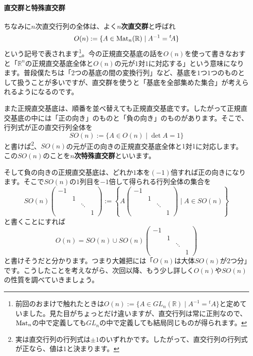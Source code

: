 \paragraph{直交群と特殊直交群}

ちなみに$n$次直交行列の全体は、よく\textbf{$n$次直交群}と呼ばれ
\[
O(n) := \{A \in \operatorname{Mat}_n(\mathbb{R}) \mid A^{-1} = {}^t\!A \}
\]
という記号で表されます\footnote{前回のおまけで触れたときは$O(n) := \{A \in GL_n(\mathbb{R}) \mid A^{-1} = {}^t\!A \}$と定めていました。見た目がちょっとだけ違いますが、直交行列は常に正則なので、$\operatorname{Mat}_n$の中で定義しても$GL_n$の中で定義しても結局同じものが得られます。}。今の正規直交基底の話を$O(n)$を使って書きなおすと「$\mathbb{R}^n$の正規直交基底全体と$O(n)$の元が$1$対$1$に対応する」という意味になります。普段僕たちは「$2$つの基底の間の変換行列」など、基底を$1$つ$1$つのものとして扱うことが多いですが、直交群を使うと「基底を全部集めた集合」が考えられるようになるのです。

また正規直交基底は、順番を並べ替えても正規直交基底です。したがって正規直交基底の中には「正の向き」のものと「負の向き」のものがあります。そこで、行列式が正の直交行列全体を
\[
SO(n) := \{A \in O(n) \mid \det A = 1\}
\]
と書けば\footnote{実は直交行列の行列式は$\pm1$のいずれかです。したがって、直交行列の行列式が正なら、値は$1$と決まります。}、$SO(n)$の元が正の向きの正規直交基底全体と$1$対$1$に対応します。この$SO(n)$のことを\textbf{$n$次特殊直交群}といいます。

そして負の向きの正規直交基底は、どれか$1$本を$(-1)$倍すれば正の向きになります。そこで$SO(n)$の$1$列目を$-1$倍して得られる行列全体の集合を
\[
SO(n)
\begin{pmatrix}
-1 & \\
& 1 & \\
& & \ddots \\
& & & 1
\end{pmatrix}
:=
\left\{
A
\begin{pmatrix}
-1 & \\
& 1 & \\
& & \ddots \\
& & & 1
\end{pmatrix}
\mid
A \in SO(n)
\right\}
\]
と書くことにすれば
\[
O(n) =
SO(n)
\cup
SO(n)
\begin{pmatrix}
-1 & \\
& 1 & \\
& & \ddots \\
& & & 1
\end{pmatrix}
\]
と書けそうだと分かります。つまり大雑把には「$O(n)$は大体$SO(n)$が$2$つ分」です。こうしたことを考えながら、次回以降、もう少し詳しく$O(n)$や$SO(n)$の性質を調べていきましょう。

